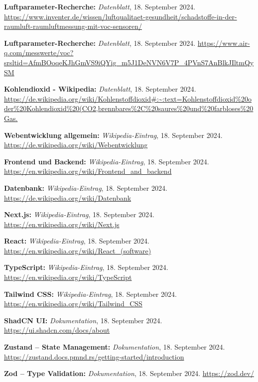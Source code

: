 \begin{thebibliography}{9999}
\textbf{Luftparameter-Recherche:} \textit{Datenblatt}, 18. September 2024.  
\url{https://www.inventer.de/wissen/luftqualitaet-gesundheit/schadstoffe-in-der-raumluft-raumluftmessung-mit-voc-sensoren/}

\textbf{Luftparameter-Recherche:} \textit{Datenblatt}, 18. September 2024.  
\url{https://www.air-q.com/messwerte/voc?srsltid=AfmBOoqeKJhGmVS9iQYig_m5J1DeNVN6V7P_4PVnS7AnBlkJIltmQySM}

\textbf{Kohlendioxid - Wikipedia:} \textit{Datenblatt}, 18. September 2024.  
\url{https://de.wikipedia.org/wiki/Kohlenstoffdioxid#:~:text=Kohlenstoffdioxid%20oder%20Kohlendioxid%20(CO2,brennbares%2C%20saures%20und%20farbloses%20Gas.}



\textbf{Webentwicklung allgemein:} \textit{Wikipedia-Eintrag}, 18. September 2024.  
\url{https://de.wikipedia.org/wiki/Webentwicklung}

\textbf{Frontend und Backend:} \textit{Wikipedia-Eintrag}, 18. September 2024.  
\url{https://en.wikipedia.org/wiki/Frontend_and_backend}

\textbf{Datenbank:} \textit{Wikipedia-Eintrag}, 18. September 2024.  
\url{https://de.wikipedia.org/wiki/Datenbank}

\textbf{Next.js:} \textit{Wikipedia-Eintrag}, 18. September 2024.  
\url{https://en.wikipedia.org/wiki/Next.js}

\textbf{React:} \textit{Wikipedia-Eintrag}, 18. September 2024.  
\url{https://en.wikipedia.org/wiki/React_(software)}

\textbf{TypeScript:} \textit{Wikipedia-Eintrag}, 18. September 2024.  
\url{https://en.wikipedia.org/wiki/TypeScript}

\textbf{Tailwind CSS:} \textit{Wikipedia-Eintrag}, 18. September 2024.  
\url{https://en.wikipedia.org/wiki/Tailwind_CSS}

\textbf{ShadCN UI:} \textit{Dokumentation}, 18. September 2024.  
\url{https://ui.shadcn.com/docs/about}

\textbf{Zustand – State Management:} \textit{Dokumentation}, 18. September 2024.  
\url{https://zustand.docs.pmnd.rs/getting-started/introduction}

\textbf{Zod – Type Validation:} \textit{Dokumentation}, 18. September 2024.  
\url{https://zod.dev/}


\end{thebibliography}
